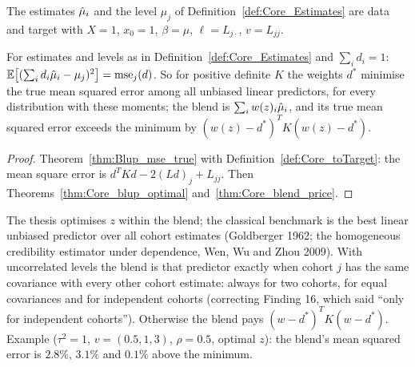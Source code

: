 \begin{definition}\label{def:Core_toTarget}
  \leanok
  The estimates $\hat\mu_i$ and the level $\mu_j$ of Definition~\ref{def:Core_Estimates} are data
  and target with $X = 1$, $x_0 = 1$, $\beta = \mu$, $\ell = L_{j\cdot}$, $v = L_{jj}$.
\end{definition}

\begin{theorem}\label{thm:Core_blup_mse}
  \leanok
  For estimates and levels as in Definition~\ref{def:Core_Estimates} and
  $\sum_i d_i = 1$:
  $\mathbb E\bigl[(\sum_i d_i\hat\mu_i - \mu_j)^2\bigr] = \mathrm{mse}_j(d)$. So
  for positive definite $K$ the weights $d^*$ minimise the true mean squared
  error among all unbiased linear predictors, for every distribution with
  these moments; the blend is $\sum_i w(z)_i\hat\mu_i$, and its true mean squared
  error exceeds the minimum by $(w(z)-d^*)^TK(w(z)-d^*)$.
\end{theorem}
\begin{proof}
  \leanok
  Theorem~\ref{thm:Blup_mse_true} with Definition~\ref{def:Core_toTarget}: the mean square
  error is $d^TKd - 2(Ld)_j + L_{jj}$. Then Theorems~\ref{thm:Core_blup_optimal}
  and~\ref{thm:Core_blend_price}.
\end{proof}

\begin{remark}\label{rem:blup}
  The thesis optimises $z$ within the blend; the classical benchmark is the
  best linear unbiased predictor over all cohort estimates (Goldberger 1962;
  the homogeneous credibility estimator under dependence, Wen, Wu and Zhou
  2009). With uncorrelated levels the blend is that predictor exactly when
  cohort $j$ has the same covariance with every other cohort estimate: always
  for two cohorts, for equal covariances and for independent cohorts
  (correcting Finding 16, which said ``only for independent cohorts'').
  Otherwise the blend pays $(w-d^*)^TK(w-d^*)$. Example ($\tau^2 = 1$,
  $v = (0.5, 1, 3)$, $\rho = 0.5$, optimal $z$): the blend's mean squared
  error is $2.8\%$, $3.1\%$ and $0.1\%$ above the minimum.
\end{remark}

